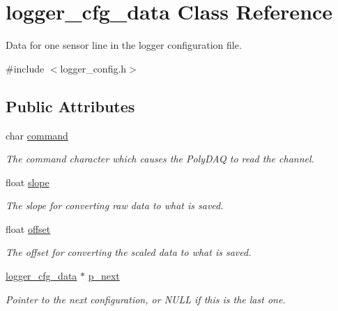 \hypertarget{classlogger__cfg__data}{\section{logger\-\_\-cfg\-\_\-data Class Reference}
\label{classlogger__cfg__data}
}


Data for one sensor line in the logger configuration file.  




{\ttfamily \#include $<$logger\-\_\-config.\-h$>$}

\subsection*{Public Attributes}
\begin{DoxyCompactItemize}
\item 
\hypertarget{classlogger__cfg__data_a893f053c8239c8bb351434948330c0b5}{char \hyperlink{classlogger__cfg__data_a893f053c8239c8bb351434948330c0b5}{command}}\label{classlogger__cfg__data_a893f053c8239c8bb351434948330c0b5}

\begin{DoxyCompactList}\small\item\em The command character which causes the Poly\-D\-A\-Q to read the channel. \end{DoxyCompactList}\item 
\hypertarget{classlogger__cfg__data_ac0defeece39d95dafc73278e1851312b}{float \hyperlink{classlogger__cfg__data_ac0defeece39d95dafc73278e1851312b}{slope}}\label{classlogger__cfg__data_ac0defeece39d95dafc73278e1851312b}

\begin{DoxyCompactList}\small\item\em The slope for converting raw data to what is saved. \end{DoxyCompactList}\item 
\hypertarget{classlogger__cfg__data_a8ebe35406e6ad305444833dd87b80d72}{float \hyperlink{classlogger__cfg__data_a8ebe35406e6ad305444833dd87b80d72}{offset}}\label{classlogger__cfg__data_a8ebe35406e6ad305444833dd87b80d72}

\begin{DoxyCompactList}\small\item\em The offset for converting the scaled data to what is saved. \end{DoxyCompactList}\item 
\hypertarget{classlogger__cfg__data_a6c53a0edb066f71f985a14184da09d39}{\hyperlink{classlogger__cfg__data}{logger\-\_\-cfg\-\_\-data} $\ast$ \hyperlink{classlogger__cfg__data_a6c53a0edb066f71f985a14184da09d39}{p\-\_\-next}}\label{classlogger__cfg__data_a6c53a0edb066f71f985a14184da09d39}

\begin{DoxyCompactList}\small\item\em Pointer to the next configuration, or {\ttfamily N\-U\-L\-L} if this is the last one. \end{DoxyCompactList}\end{DoxyCompactItemize}


